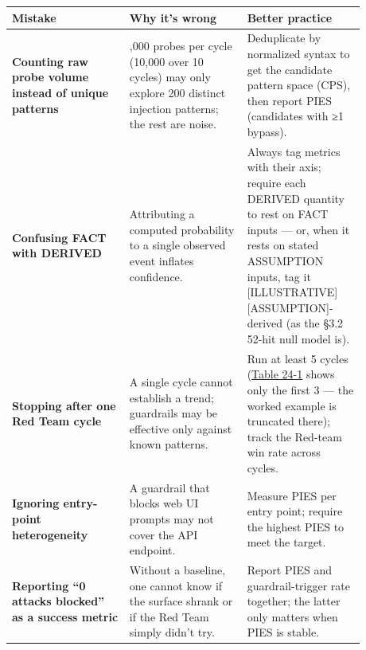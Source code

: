 \nopagebreak[4]
\begin{longtable}[]{@{}
  >{\raggedright\arraybackslash}p{0.2927\linewidth}
  >{\raggedright\arraybackslash}p{0.2927\linewidth}
  >{\raggedright\arraybackslash}p{0.2927\linewidth}@{}}
\toprule\noalign{}
\begin{minipage}[b]{\linewidth}\raggedright
Mistake
\end{minipage} & \begin{minipage}[b]{\linewidth}\raggedright
Why it's wrong
\end{minipage} & \begin{minipage}[b]{\linewidth}\raggedright
Better practice
\end{minipage} \\
\midrule\noalign{}
\endhead
\bottomrule\noalign{}
\endlastfoot
\textbf{Counting raw probe volume instead of unique patterns} & 1,000
probes per cycle (10,000 over 10 cycles) may only explore 200 distinct
injection patterns; the rest are noise. & Deduplicate by normalized
syntax to get the candidate pattern space (CPS), then report PIES
(candidates with ≥1 bypass). \\
\noalign{\label{tab:24.4}}
\textbf{Confusing FACT with DERIVED} & Attributing a computed
probability to a single observed event inflates confidence. & Always tag
metrics with their axis; require each DERIVED quantity to rest on FACT
inputs --- or, when it rests on stated ASSUMPTION inputs, tag it
\mbox{{[}ILLUSTRATIVE{]}}\hspace{0pt}\mbox{{[}ASSUMPTION{]}}-derived (as the §3.2 52-hit null
model is). \\
\textbf{Stopping after one Red Team cycle} & A single cycle cannot
establish a trend; guardrails may be effective only against known
patterns. & Run at least 5 cycles (\hyperref[tab:24.1]{Table 24-1} shows only the first 3 ---
the worked example is truncated there); track the Red-team win rate
across cycles. \\
\textbf{Ignoring entry-point heterogeneity} & A guardrail that blocks
web UI prompts may not cover the API endpoint. & Measure PIES per entry
point; require the highest PIES to meet the target. \\
\textbf{Reporting ``0 attacks blocked'' as a success metric} & Without a
baseline, one cannot know if the surface shrank or if the Red Team
simply didn't try. & Report PIES and guardrail-trigger rate together;
the latter only matters when PIES is stable. \\
\end{longtable}

